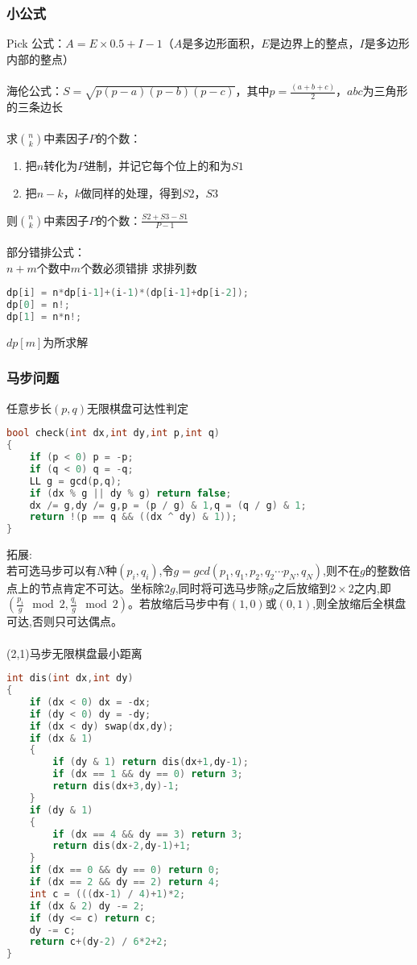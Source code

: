 	\subsubsection{小公式}
	Pick 公式：$A = E\times 0.5+I-1$（$A$是多边形面积，$E$是边界上的整点，$I$是多边形内部的整点）\\
	\\
	海伦公式：$S = \sqrt{p(p-a)(p-b)(p-c)}$，其中$p = \frac{(a+b+c)}{2}$，$abc$为三角形的三条边长\\
	\\
	求$\binom{n}{k}$中素因子$P$的个数：\\
	\begin {enumerate}
	\item 把$n$转化为$P$进制，并记它每个位上的和为$S1$
	\item 把$n-k$，$k$做同样的处理，得到$S2$，$S3$
	\end{enumerate}
	则$\binom{n}{k}$中素因子$P$的个数：$\frac{S2+S3-S1}{P-1}$\\
	\\
	部分错排公式：\\
	$n+m$个数中$m$个数必须错排 求排列数
	\begin{lstlisting}[language=c++]
dp[i] = n*dp[i-1]+(i-1)*(dp[i-1]+dp[i-2]);
dp[0] = n!;
dp[1] = n*n!;
	\end{lstlisting}
	$dp[m]$为所求解\\
	
	\subsubsection{马步问题}
	任意步长$(p,q)$无限棋盘可达性判定
	\begin{lstlisting}[language=c++]
bool check(int dx,int dy,int p,int q)
{
	if (p < 0) p = -p;
	if (q < 0) q = -q;
	LL g = gcd(p,q);
	if (dx % g || dy % g) return false;
	dx /= g,dy /= g,p = (p / g) & 1,q = (q / g) & 1;
	return !(p == q && ((dx ^ dy) & 1));
}
	\end{lstlisting}
	拓展:\\
	若可选马步可以有$N$种$(p_i,q_i)$,令$g = gcd(p_1,q_1,p_2,q_2\cdots p_N,q_N)$,则不在$g$的整数倍点上的节点肯定不可达。坐标除$2g$,同时将可选马步除$g$之后放缩到$2\times 2$之内,即$(\frac{p_i}{g}\mod 2,\frac{q_i}{g}\mod 2)$。若放缩后马步中有$(1,0)$或$(0,1)$,则全放缩后全棋盘可达,否则只可达偶点。\\
	\\
	(2,1)马步无限棋盘最小距离
	\begin{lstlisting}[language=c++]
int dis(int dx,int dy)
{
	if (dx < 0) dx = -dx;
	if (dy < 0) dy = -dy;
	if (dx < dy) swap(dx,dy);
	if (dx & 1)
	{
		if (dy & 1) return dis(dx+1,dy-1);
		if (dx == 1 && dy == 0) return 3;
		return dis(dx+3,dy)-1;
	}
	if (dy & 1)
	{
		if (dx == 4 && dy == 3) return 3;
		return dis(dx-2,dy-1)+1;
	}
	if (dx == 0 && dy == 0) return 0;
	if (dx == 2 && dy == 2) return 4;
	int c = (((dx-1) / 4)+1)*2;
	if (dx & 2) dy -= 2;
	if (dy <= c) return c;
	dy -= c;
	return c+(dy-2) / 6*2+2;
}
	\end{lstlisting}